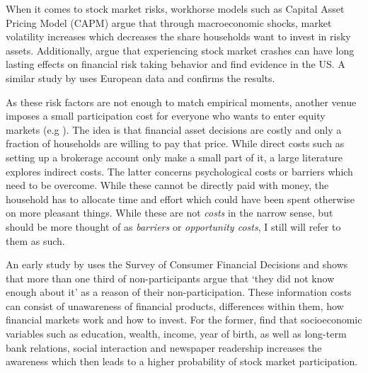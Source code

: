 \documentclass[ProjectABM]{subfiles}
\begin{document}
When it comes to stock market risks, workhorse models such as Capital Asset Pricing Model (CAPM) argue that through macroeconomic shocks, market volatility increases which decreases the share households want to invest in risky assets. Additionally, \cite{malmendier_2011} argue that experiencing stock market crashes can have long lasting effects on financial risk taking behavior and find evidence in the US. A similar study by \cite{ampudia_ehrmann_2017macroeconomic} uses European data and confirms the results. 

As these risk factors are not enough to match empirical moments, another venue imposes a small participation cost for everyone who wants to enter equity markets (e.g \cite{vissing_2003, HM2003portfolio, GM2005portfolio}). The idea is that financial asset decisions are costly and only a fraction of households are willing to pay that price. While direct costs such as setting up a brokerage account only make a small part of it, a large literature explores indirect costs. The latter concerns psychological costs or barriers which need to be overcome. While these cannot be directly paid with money, the household has to allocate time and effort which could have been spent otherwise on more pleasant things. While these are not \textit{costs} in the narrow sense, but should be more thought of as \textit{barriers} or \textit{opportunity costs}, I still will refer to them as such.


An early study by \cite{king_leape_1987asset} uses the Survey of Consumer Financial Decisions and shows that more than one third of non-participants argue that `they did not know enough about it' as a reason of their non-participation. These information costs can consist of unawareness of financial products, differences within them, how financial markets work and how to invest. %
For the former, \cite{guiso_jappelli_2005} find that socioeconomic variables such as education, wealth, income, year of birth, as well as long-term bank relations, social interaction and newspaper readership increases the awareness which then leads to a higher probability of stock market participation. 
\end{document}
